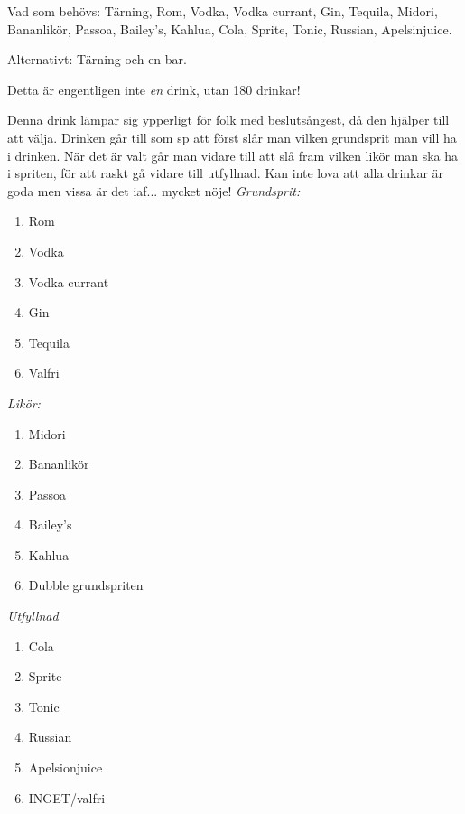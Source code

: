 

\pagestyle{Drinktips}


\filbreak
{}

Vad som behövs: Tärning, Rom, Vodka, Vodka currant, Gin, Tequila, Midori, Bananlikör, Passoa, Bailey's, Kahlua, Cola, Sprite, Tonic, Russian, Apelsinjuice.

Alternativt: Tärning och en bar.

Detta är engentligen inte \emph{en} drink, utan 180 drinkar!

Denna drink lämpar sig ypperligt för folk med beslutsångest, då den hjälper till att välja. Drinken går till som sp att först slår man vilken grundsprit man vill ha i drinken. När det är valt går man vidare till att slå fram vilken likör man ska ha i spriten, för att raskt gå vidare till utfyllnad. Kan inte lova att alla drinkar är goda men vissa är det iaf... mycket nöje!
\filbreak
\emph{Grundsprit:}
\begin{enumerate}
    \item Rom
    \item Vodka
    \item Vodka currant
    \item Gin
    \item Tequila
    \item Valfri
\end{enumerate}
\filbreak
\emph{Likör:}
\begin{enumerate}
    \item Midori
    \item Bananlikör
    \item Passoa
    \item Bailey's
    \item Kahlua
    \item Dubble grundspriten
\end{enumerate}
\filbreak
\emph{Utfyllnad}
\begin{enumerate}
    \item Cola
    \item Sprite
    \item Tonic
    \item Russian
    \item Apelsionjuice
    \item INGET/valfri
\end{enumerate}
\filbreak
{}

